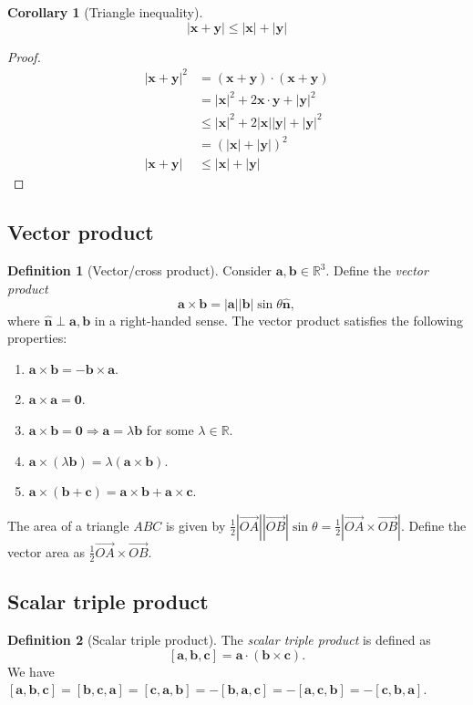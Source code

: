 \documentclass[a4paper]{article}
\theoremstyle{definition}
\newtheorem*{defi}{Definition}
\newtheorem*{cor}{Corollary}
\newcommand{\mb}[1]{\mathbf{#1}}
\newcommand{\R}{\mathbb{R}}
\begin{document}
\begin{cor}[Triangle inequality]
  \[
  \mb{|x + y|} \leq \mb{|x| + |y|}
  \]
\end{cor}
\begin{proof}
  \begin{align*}
    |\mb{x + y}|^2 &= \mb{(x + y)\cdot (x + y)}\\
    &= |\mb{x}|^2 + 2\mb{x\cdot y} + |\mb{y}|^2\\
    &\leq |\mb{x}|^2 + 2\mb{|x||y|} + |\mb{y}|^2\\
    &= (\mb{|x| + |y|})^2\\
    \mb{|x + y|} &\leq \mb{|x| + |y|}
  \end{align*}
\end{proof}

\subsection{Vector product}
\begin{defi}[Vector/cross product]
  Consider $\mb{a, b}\in \R^3$. Define the \emph{vector product}
  \[
  \mb{a\times b} = \mb{|a||b|}\sin\theta \hat{\mb{n}},
  \]
  where $\mb{\hat{n}\perp a, b}$ in a right-handed sense. The vector product satisfies the following properties:
  \begin{enumerate}
  \item $\mb{a\times b = -b\times a}$.
  \item $\mb{a\times a = 0}$.
  \item $\mb{a\times b = 0}\Rightarrow \mb{a} = \lambda\mb{b}$ for some $\lambda\in \R$.
  \item $\mb{a}\times (\lambda \mb{b}) = \lambda(\mb{a\times b})$.
  \item $\mb{a\times (b + c) = a\times b + a\times c}$.
  \end{enumerate}
\end{defi}

The area of a triangle $ABC$ is given by $\frac{1}{2}|\overrightarrow{OA}||\overrightarrow{OB}|\sin\theta = \frac{1}{2}|\overrightarrow{OA}\times\overrightarrow{OB}|$. Define the vector area as $\frac{1}{2}\overrightarrow{OA}\times\overrightarrow{OB}$.

\subsection{Scalar triple product}
\begin{defi}[Scalar triple product]
  The \emph{scalar triple product} is defined as
  \[
  \mb{[a, b, c] = a\cdot (b\times c)}.
  \]
We have $\mb{[a, b, c] = [b, c, a] = [c, a, b] = -[b, a, c] = -[a, c, b] = -[c, b, a]}$.
\end{defi}
\end{document}
